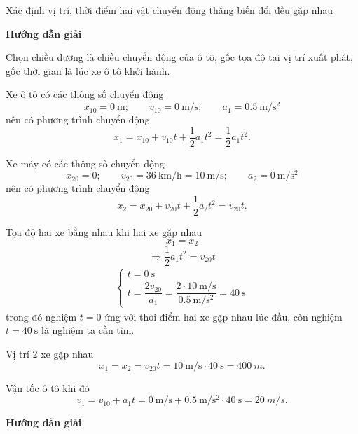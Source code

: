 \begin{dang}{Xác định vị trí, thời điểm hai vật chuyển động thẳng biến đổi đều gặp nhau}
	{	\begin{center}
			\textbf{Hướng dẫn giải}
		\end{center}
		Chọn chiều dương là chiều chuyển động của ô tô, gốc tọa độ tại vị trí xuất phát, gốc thời gian là lúc xe ô tô khởi hành.
		
		Xe ô tô có các thông số chuyển động 
		$$x_{10} = \SI{0}{\meter};\qquad  v_{10} = \SI{0}{\meter/\second};\qquad a_1 = \SI{0.5}{\meter
			/\second^{2}}$$	
		nên có phương trình chuyển động 
		$$x_1 = x_{10}+v_{10}t+\dfrac{1}{2}a_{1}t^{2}=\dfrac{1}{2}a_1t^2.$$
		
		Xe máy có các thông số chuyển động 
		$$x_{20} = 0;\qquad v_{20} =\SI{36}{\kilo\meter/\hour}=\SI{10}{\meter/\second};\qquad a_{2} = \SI{0}{\meter/\second^{2}}$$	
		nên có phương trình chuyển động 
		$$x_2 =x_{20}+v_{20}t+\dfrac{1}{2}a_2t^2=v_{20}t.$$
		
		Tọa độ hai xe bằng nhau khi hai xe gặp nhau
			$$x_1=x_2$$
			$$\Rightarrow\dfrac{1}{2}a_1t^2=v_{20}t$$
		\begin{align*}
			\begin{cases}
				t=\SI{0}{\second}\\
				t=\dfrac{2v_{20}}{a_1}=\dfrac{2\cdot\SI{10}{\meter/\second}}{\SI{0.5}{\meter/\second^{2}}}=\SI{40}{\second}
			\end{cases}
		\end{align*}
		trong đó nghiệm $t=0$ ứng với thời điểm hai xe gặp nhau lúc đầu, còn nghiệm $t=\SI{40}{\second}$ là nghiệm ta cần tìm. 
		
		Vị trí 2 xe gặp nhau 
		$$x_1=x_2=v_{20}t =\SI{10}{\meter/\second}\cdot\SI{40}{\second}= \SI{400}{m}.$$
		
		Vận tốc ô tô khi đó 
		$$v_1 = v_{10}+ a_1t = \SI{0}{\meter/\second}+\SI{0.5}{\meter/\second^{2}}\cdot\SI{40}{\second}=\SI{20}{m/s}.$$  
	}
	{	\begin{center}
			\textbf{Hướng dẫn giải}
		\end{center}
		
}
\end{dang}
